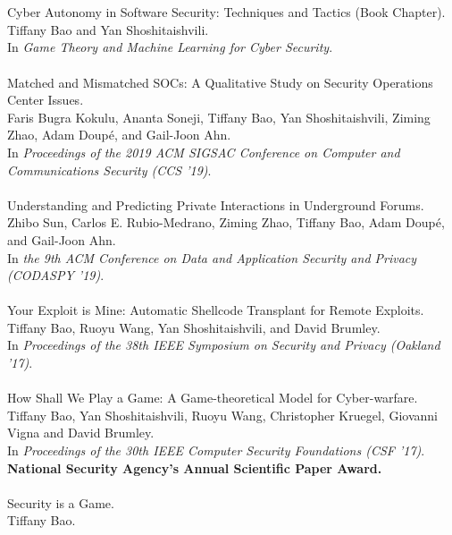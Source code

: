 \documentclass[11pt]{article}
\begin{document}
\\\\
%
Cyber Autonomy in Software Security: Techniques and Tactics (Book Chapter). \\
Tiffany Bao and Yan Shoshitaishvili. \\
In \emph{Game Theory and Machine Learning for Cyber Security}.
\\\\
Matched and Mismatched SOCs: A Qualitative Study on Security Operations Center Issues. \\
Faris Bugra Kokulu, Ananta Soneji, Tiffany Bao, Yan Shoshitaishvili, Ziming Zhao, Adam Doupé, and Gail-Joon Ahn. \\
In \emph{Proceedings of the 2019 ACM SIGSAC Conference on Computer and Communications Security (CCS '19)}.
\\\\
%
Understanding and Predicting Private Interactions in Underground Forums. \\
Zhibo Sun, Carlos E. Rubio-Medrano, Ziming Zhao, Tiffany Bao, Adam Doupé, and Gail-Joon Ahn.\\
In \emph{the 9th ACM Conference on Data and Application Security and Privacy (CODASPY '19)}.
\\\\
%
Your Exploit is Mine: Automatic Shellcode Transplant for
Remote Exploits.\\
Tiffany Bao, Ruoyu Wang, Yan Shoshitaishvili, and David
Brumley.\\
In \emph{Proceedings of the 38th IEEE Symposium on
Security and Privacy (Oakland '17)}.
\\\\
%
How Shall We Play a Game: A Game-theoretical Model for
Cyber-warfare.\\
Tiffany Bao, Yan Shoshitaishvili, Ruoyu Wang, Christopher Kruegel,
Giovanni Vigna and David Brumley. \\
In \emph{Proceedings of the 30th IEEE Computer Security Foundations
(CSF '17)}. \\
\textbf{National Security Agency's Annual Scientific Paper Award.}
\\\\
%
Security is a Game. \\
Tiffany Bao. \\
\end{document}
